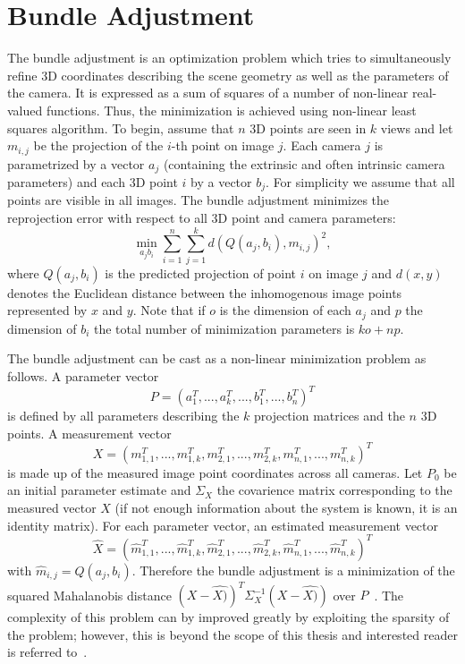 \section{Bundle Adjustment}
\label{sec:bundle-adjustment}
The bundle adjustment is an optimization problem which tries to simultaneously refine 3D coordinates describing the scene geometry as well as the parameters of the camera. It is expressed as a sum of squares of a number of non-linear real-valued functions. Thus, the minimization is achieved using non-linear least squares algorithm. To begin, assume that $n$ 3D points are seen in $k$ views and let $m_{i,j}$ be the projection of the $i$-th point on image $j$. Each camera $j$ is parametrized by a vector $a_j$ (containing the extrinsic and often intrinsic camera parameters) and each 3D point $i$ by a vector $b_j$. For simplicity we assume that all points are visible in all images. The bundle adjustment minimizes the reprojection error with respect to all 3D point and camera parameters:
\begin{equation}
	\underset{a_j b_i}{\min} \overset{n}{\underset{i=1}{\sum}} \overset{k}{\underset{j=1}{\sum}} d(Q(a_j, b_i) ,m_{i,j})^2,
	\label{eq:bundle-adjustment}
\end{equation}
where $Q(a_j, b_i)$ is the predicted projection of point $i$ on image $j$ and $d(x,y)$ denotes the Euclidean distance between the inhomogenous image points represented by $x$ and $y$. Note that if $o$ is the dimension of each $a_j$ and $p$ the dimension of $b_i$ the total number of minimization parameters is $ko + np$. 

The bundle adjustment can be cast as a non-linear minimization problem as follows. A parameter vector 
\begin{equation}
P=(a_1^T,...,a_k^T,...,b_1^T,...,b_n^T)^T
\end{equation}
 is defined by all parameters describing the $k$ projection matrices and the $n$ 3D points. A measurement vector 
 \begin{equation}
 X = (m_{1,1}^T,...,m_{1,k}^T, m_{2,1}^T,...,m_{2,k}^T, m_{n,1}^T,...,m_{n,k}^T)^T
 \end{equation}
 is made up of the measured image point coordinates across all cameras. Let $P_0$ be an initial parameter estimate and $\Sigma_X$ the covarience matrix corresponding to the measured vector $X$ (if not enough information about the system is known, it is an identity matrix). For each parameter vector, an estimated measurement vector 
 \begin{equation}
 	\hat{X} = (\hat{m}_{1,1}^T,...,\hat{m}_{1,k}^T, \hat{m}_{2,1}^T,...,\hat{m}_{2,k}^T, \hat{m}_{n,1}^T,...,\hat{m}_{n,k}^T)^T
 \end{equation}
 with $\hat{m}_{i,j} = Q(a_j,b_i)$. Therefore the bundle adjustment is a minimization of the squared Mahalanobis distance $(X-\hat{X)})^T\Sigma_X^{-1}(X-\hat{X)})$ over $P$~\cite{Lourakis04thedesign}. The complexity of this problem can by improved greatly by exploiting the sparsity of the problem; however, this is beyond the scope of this thesis and interested reader is referred to~\cite{nlsq}.
 

